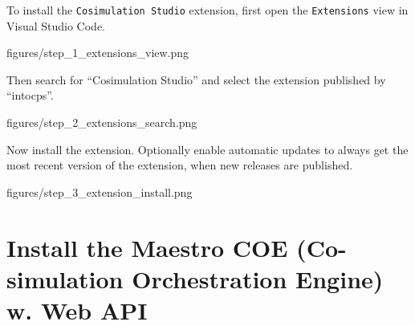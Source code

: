 \documentclass[11pt,a4paper]{../tutorial}
\newcommand{\cosimext}{\texttt{Cosimulation Studio}\xspace}
\begin{document}
\begin{instructions} 

\item To install the \cosimext{} extension, first open the \texttt{Extensions} view in Visual Studio Code.
	
	\begin{annotation}[width=0.85\linewidth]{figures/step_1_extensions_view.png}
	\end{annotation}

\item Then search for ``Cosimulation Studio'' and select the extension published by ``intocps''.
	
	\begin{annotation}[width=0.85\linewidth]{figures/step_2_extensions_search.png}
	\end{annotation}

\item Now install the extension. Optionally enable automatic updates to always get the most recent version of the extension, when new releases are published.
	
	\begin{annotation}[width=0.85\linewidth]{figures/step_3_extension_install.png}
	\end{annotation}

\end{instructions}

\newpage 

\section{Install the Maestro COE (Co-simulation Orchestration Engine) w. Web API}
\end{document}
